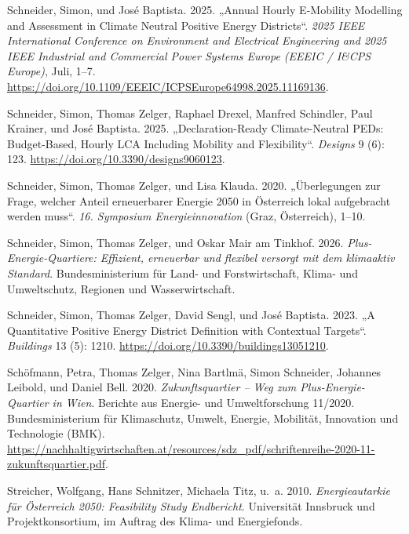 \documentclass[
  ngerman,
  a4paper,
  DIV=11]{scrreprt}
\newlength{\cslhangindent}
\newenvironment{CSLReferences}[2] %
 {\begin{list}{}{%
  \setlength{\itemindent}{0pt}
  \setlength{\leftmargin}{0pt}
  \setlength{\parsep}{0pt}
  \ifodd #1
   \setlength{\leftmargin}{\cslhangindent}
   \setlength{\itemindent}{-1\cslhangindent}
  \fi
  \setlength{\itemsep}{#2\baselineskip}}}
 {\end{list}}
\begin{document}
\begin{CSLReferences}{1}{1}
Schneider, Simon, und José Baptista. 2025. {„Annual {Hourly}
{E}-{Mobility} {Modelling} and {Assessment} in {Climate} {Neutral}
{Positive} {Energy} {Districts}``}. \emph{2025 {IEEE} {International}
{Conference} on {Environment} and {Electrical} {Engineering} and 2025
{IEEE} {Industrial} and {Commercial} {Power} {Systems} {Europe} ({EEEIC}
/ {I}\&{CPS} {Europe})}, Juli, 1--7.
\url{https://doi.org/10.1109/EEEIC/ICPSEurope64998.2025.11169136}.

Schneider, Simon, Thomas Zelger, Raphael Drexel, Manfred Schindler, Paul
Krainer, und José Baptista. 2025. {„Declaration-Ready Climate-Neutral
{PEDs}: Budget-Based, Hourly {LCA} Including Mobility and
Flexibility``}. \emph{Designs} 9 (6): 123.
\url{https://doi.org/10.3390/designs9060123}.

Schneider, Simon, Thomas Zelger, und Lisa Klauda. 2020. {„Überlegungen
zur Frage, welcher Anteil erneuerbarer Energie 2050 in Österreich lokal
aufgebracht werden muss``}. \emph{16. Symposium Energieinnovation}
(Graz, Österreich), 1--10.

Schneider, Simon, Thomas Zelger, und Oskar Mair am Tinkhof. 2026.
\emph{Plus-Energie-Quartiere: Effizient, erneuerbar und flexibel
versorgt mit dem klimaaktiv Standard}. Bundesministerium für Land- und
Forstwirtschaft, Klima- und Umweltschutz, Regionen und Wasserwirtschaft.

Schneider, Simon, Thomas Zelger, David Sengl, und José Baptista. 2023.
{„A Quantitative Positive Energy District Definition with Contextual
Targets``}. \emph{Buildings} 13 (5): 1210.
\url{https://doi.org/10.3390/buildings13051210}.

Schöfmann, Petra, Thomas Zelger, Nina Bartlmä, Simon Schneider, Johannes
Leibold, und Daniel Bell. 2020. \emph{Zukunftsquartier -- Weg zum
Plus-Energie-Quartier in Wien}. Berichte aus Energie- und
Umweltforschung 11/2020. Bundesministerium für Klimaschutz, Umwelt,
Energie, Mobilität, Innovation und Technologie (BMK).
\url{https://nachhaltigwirtschaften.at/resources/sdz_pdf/schriftenreihe-2020-11-zukunftsquartier.pdf}.

Streicher, Wolfgang, Hans Schnitzer, Michaela Titz, u.~a. 2010.
\emph{Energieautarkie für Österreich 2050: Feasibility Study
Endbericht}. Universität Innsbruck und Projektkonsortium, im Auftrag des
Klima- und Energiefonds.


\end{CSLReferences}
\end{document}
